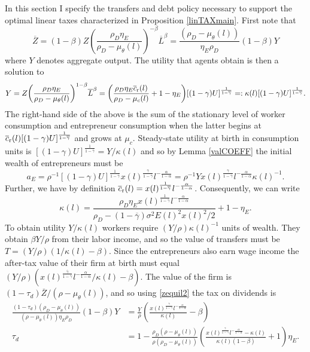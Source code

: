 \documentclass[11pt]{article}
\theoremstyle{plain}
\begin{document}
In this section I specify the transfers and debt policy necessary to support the optimal linear taxes characterized in Proposition \ref{linTAXmain}. First note that
\begin{equation}
\overline{Z} = (1-\beta)Z{\left(\frac{\rho_D\eta_E}{\rho_D - \mu_{\theta}(l)} \right)}^{-\beta}\overline{L}^{\beta} = \frac{(\rho_D - \mu_{\theta}(l))}{\eta_E \rho_D}(1-\beta)Y
\label{zequil2}
\end{equation}
where $Y$ denotes aggregate output. The utility that agents obtain is then a solution to
$$ 
Y = Z{\left(\frac{\rho_D\eta_E}{\rho_D - \mu_{\theta}(l)} \right)}^{1-\beta}\overline{L}^{\beta} = {\left(\frac{\rho_D \eta_E\overline{c}_{\textnormal{r}}(l)}{\rho_D - \mu_c(l)} + 1 - \eta_E\right)}[(1-\gamma)U]^{\frac{1}{1-\overline{\gamma}}} =: \kappa(l)[(1-\gamma)U]^{\frac{1}{1-\overline{\gamma}}}.
$$
The right-hand side of the above is the sum of the stationary level of worker consumption and entrepreneur consumption when the latter begins at $\overline{c}_{\textnormal{r}}(l)[(1-\gamma)U]^{\frac{1}{1-\overline{\gamma}}}$ and grows at $\mu_c$. Steady-state utility at birth in consumption units is $[(1-\gamma)U]^{\frac{1}{1-\overline{\gamma}}} = Y/\kappa(l)$ and so by Lemma \ref{valCOEFF} the initial wealth of entrepreneurs must be 
$$
a_E = \rho^{-1} [(1-\gamma)U]^{\frac{1}{1-\overline{\gamma}}}x(l)^{\frac{\overline{\gamma}}{1-\overline{\gamma}}}l^{-\frac{\alpha}{1-\alpha}} = \rho^{-1}Yx(l)^{\frac{\overline{\gamma}}{1-\overline{\gamma}}}l^{-\frac{\alpha}{1-\alpha}}  \kappa(l)^{-1}.
$$
Further, we have by definition $\overline{c}_{\textnormal{r}}(l) = x(l)^{\frac{1}{1-\overline{\gamma}}}l^{-\frac{\alpha}{1-\alpha}}$. Consequently, we can write 
\begin{equation}
\kappa(l) = \frac{\rho_D \eta_E x(l)^{\frac{1}{1-\overline{\gamma}}}l^{-\frac{\alpha}{1-\alpha}}}{\rho_D - (1-\overline{\gamma})\sigma^2 E(l)^2 x(l)^2/2} + 1 - \eta_E.
\label{kappa}
\end{equation}
To obtain utility $Y/\kappa(l)$ workers require $(Y/\rho)\kappa(l)^{-1}$ units of wealth. They obtain $\beta Y/\rho$ from their labor income, and so the value of transfers must be $T = (Y/\rho)(1/\kappa(l) - \beta)$. Since the entrepreneurs also earn wage income the after-tax value of their firm at birth must equal $(Y/\rho){\left(x(l)^{\frac{\overline{\gamma}}{1-\overline{\gamma}}}l^{-\frac{\alpha}{1-\alpha}}/\kappa(l) - \beta\right)}$. The value of the firm is $(1-\tau_d)\overline{Z}/(\rho - \mu_{\theta}(l))$, and so using \eqref{zequil2} the tax on dividends is
\begin{align*}
\frac{(1-\tau_d)(\rho_D - \mu_{\theta}(l))}{(\rho - \mu_{\theta}(l))\eta_E \rho_D}(1-\beta)Y & = \frac{Y}{\rho}{\left( \frac{x(l)^{\frac{\overline{\gamma}}{1-\overline{\gamma}}}l^{-\frac{\alpha}{1-\alpha}}}{\kappa(l)} - \beta\right)}
\\ \tau_d & = 1 - \frac{\rho_D(\rho - \mu_{\theta}(l))}{\rho(\rho_D - \mu_{\theta}(l))}{\left( \frac{x(l)^{\frac{\overline{\gamma}}{1-\overline{\gamma}}}l^{-\frac{\alpha}{1-\alpha}}-\kappa(l)}{\kappa(l)(1-\beta)} + 1\right)}\eta_E.
\end{align*}
\end{document}
